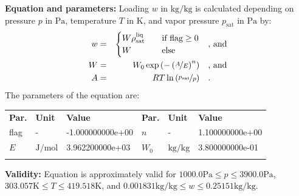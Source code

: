 \textbf{Equation and parameters:}
\newline
%
Loading $w$ in $\si{\kilogram\per\kilogram}$ is calculated depending on pressure $p$ in $\si{\pascal}$, temperature $T$ in $\si{\kelvin}$, and vapor pressure $p_\mathrm{sat}$ in $\si{\pascal}$ by:
%
\begin{equation*}
\begin{split}
w &=& \begin{cases} W \rho_\mathrm{sat}^{\mathrm{liq}} & \quad \text{if flag} \geq 0 \\ W & \quad \text{else} \end{cases} & \quad\text{, and} \\
W &=& W_0 \exp \left( - \left( \nicefrac{A}{E} \right) ^{n} \right) & \quad\text{, and} \\
A &=& R T \ln \left( \nicefrac{p_\mathrm{sat}}{p} \right) & \quad\text{.} \\
\end{split}
\end{equation*}
%
The parameters of the equation are:
%
\begin{longtable}[l]{lll|lll}
\toprule
\addlinespace
\textbf{Par.} & \textbf{Unit} & \textbf{Value} &	\textbf{Par.} & \textbf{Unit} & \textbf{Value} \\
\addlinespace
\midrule
\endhead

\bottomrule
\endfoot
\bottomrule
\endlastfoot
\addlinespace

flag & - & -1.000000000e+00 & $n$ & - & 1.100000000e+00 \\
$E$ & $\si{\joule\per\mole}$ & 3.962200000e+03 & $W_0$ & $\si{\kilogram\per\kilogram}$ & 3.800000000e-01 \\

\addlinespace\end{longtable}

\textbf{Validity:}
\newline
Equation is approximately valid for $1000.0 \si{\pascal} \leq p \leq 3900.0 \si{\pascal}$,  $303.057 \si{\kelvin} \leq T \leq 419.518 \si{\kelvin}$, and $0.001831 \si{\kilogram\per\kilogram} \leq w \leq 0.25151 \si{\kilogram\per\kilogram}$.
\newline

